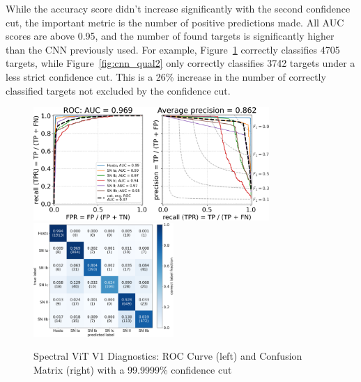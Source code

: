 While the accuracy score didn't increase significantly with the second confidence cut, 
the important metric is the number of positive predictions made. All AUC scores 
are above 0.95, and the number of found targets is significantly higher than the 
CNN previously used. For example, Figure~\ref{fig:v1_999999_qual} correctly 
classifies 4705 targets, while Figure~\ref{fig:cnn_qual2} only correctly classifies 
3742 targets under a less strict confidence cut. This is a 26\% increase in the
number of correctly classified targets not excluded by the confidence cut.

\begin{figure}
    \centering
    \includegraphics[height=4.3cm]{figures/v1_real/vit_model_V1_original_redoroc999999_e31.png}
    \quad
    \includegraphics[height=4.3cm]{figures/v1_real/vit_model_V1_original_redocm999999_e31.png}
    \caption[Spectral ViT V1 Diagnostics: 99.9999\% Cut]{Spectral ViT V1 Diagnostics: ROC Curve (left) and Confusion Matrix (right) with a 99.9999\% confidence
    cut \label{fig:v1_999999_qual}}
\end{figure}


